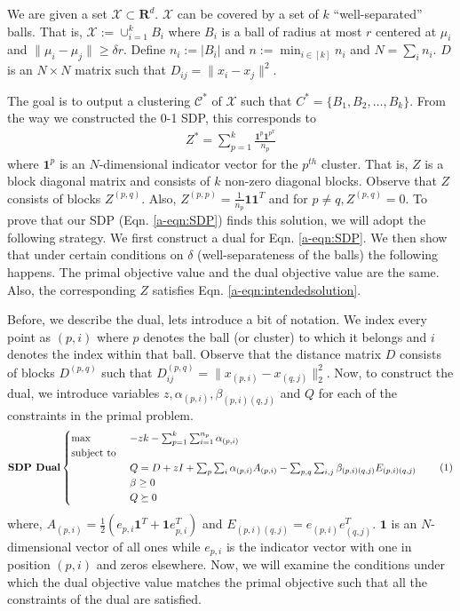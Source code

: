 \documentclass[12pt]{article}
\newcommand{\mc}{\mathcal}
\newcommand{\mb}{\mathbf}
\newcommand\numberthis{\addtocounter{equation}{1}\tag{\theequation}}
\begin{document}
We are given a set $\mc X \subset \mb R^d$. $\mc X$ can be covered by a set of $k$ ``well-separated'' balls. That is, $\mc X := \cup_{i=1}^k B_i$ where $B_i$ is a ball of radius at most $r$ centered at $\mu_i$ and $\|\mu_i - \mu_j\| \ge \delta r$. %
Define $n_i := |B_i|$ and $n := \min_{i\in[k]} n_i$ and $N = \sum_i n_i$. $D$ is an $N\times N$ matrix such that $D_{ij} = \|x_i -x_j\|^2$.  

The goal is to output a clustering $\mc C^*$ of $\mc X$ such that $C^* = \{B_1, B_2, \ldots, B_k\}$. From the way we constructed the 0-1 SDP, this corresponds to
\begin{align}
  Z^* = \sum_{p=1}^k \frac{\mb 1^p \mb 1^{p^T}}{n_p} \label{a-eqn:intendedsolution}
\end{align}
where $\mb 1^p$ is an $N$-dimensional indicator vector for the $p^{th}$ cluster. That is, $Z$ is a block diagonal matrix and consists of $k$ non-zero diagonal blocks. Observe that $Z$ consists of blocks $Z^{(p, q)}$. Also, $Z^{(p, p)} = \frac{1}{n_p}\mb 1\mb 1^T$ and for $p \neq q, Z^{(p, q)} = 0$. To prove that our SDP (Eqn. \ref{a-eqn:SDP}) finds this solution, we  will adopt the following strategy. We first construct a dual for Eqn. \ref{a-eqn:SDP}. We then show that under certain conditions on $\delta$ (well-separateness of the balls) the following happens. The primal objective value and the dual objective value are the same. Also, the corresponding $Z$ satisfies Eqn. \ref{a-eqn:intendedsolution}. 

Before, we describe the dual, lets introduce a bit of notation. We index every point as $(p, i)$ where $p$ denotes the ball (or cluster) to which it belongs and $i$ denotes the index within that ball. Observe that the distance matrix $D$ consists of blocks $D^{(p, q)}$ such that $D^{(p,q)}_{ij} = \|x_{(p,i)}-x_{(q,j)}\|^2_2$. Now, to construct the dual, we introduce variables $z, \alpha_{(p,i)}, \beta_{(p,i)(q,j)}$ and $Q$ for each of the constraints in the primal problem. 
\[\textbf{SDP Dual}
    \begin{cases}
		\max \enspace &-zk - \sum_{p=1}^{k}\sum_{i=1}^{n_p} \alpha_{(p,i)}\\
		\text{subject to } \\
		&Q = D + zI + \sum_p\sum_i \alpha_{(p,i)}A_{(p, i)} -\sum_{p,q}\sum_{i,j} \beta_{(p,i)(q,j)}E_{(p,i)(q,j)}\\
		&\beta \ge 0 \\
		&Q \succeq 0
	\end{cases}
	\label{a-eqn:SDPDual}
	\numberthis
\]
where, $A_{(p,i)} = \frac{1}{2}(e_{p,i}\mb 1^T + \mb 1 e_{p, i}^T)$ and $E_{(p,i)(q,j)} = e_{(p,i)}e_{(q,j)}^T$. $\mb 1$ is an $N$-dimensional vector of all ones while $e_{p,i}$ is the indicator vector with one in position $(p, i)$ and zeros elsewhere. Now, we will examine the conditions under which the dual objective value matches the primal objective such that all the constraints of the dual are satisfied. 
\end{document}
